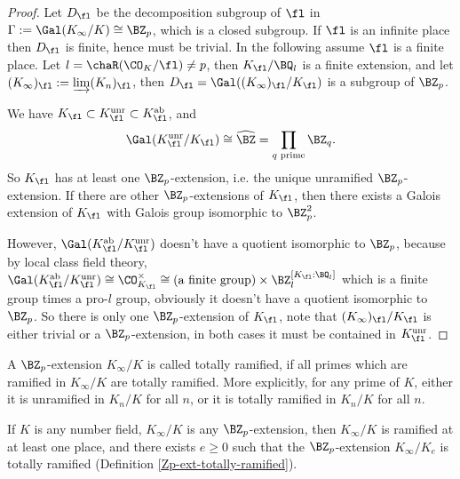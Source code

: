 \begin{proof}
Let $D_\fl$ be the decomposition subgroup of $\fl$ in $\Gamma:=\Gal(K_\infty/K)\cong\BZ_p$,
which is a closed subgroup.
If $\fl$ is an infinite place then $D_\fl$ is finite, hence must be trivial.
In the following assume $\fl$ is a finite place.
Let $l=\chaR(\CO_K/\fl)\neq p$, then $K_\fl/\BQ_l$ is a finite extension,
and let $(K_\infty)_\fl:=\varinjlim(K_n)_\fl$, then
$D_\fl=\Gal((K_\infty)_\fl/K_\fl)$ is a subgroup of $\BZ_p$.

We have $K_\fl\subset K_\fl^{\mathrm{unr}}\subset K_\fl^{\mathrm{ab}}$,
and
$$
\Gal(K_\fl^{\mathrm{unr}}/K_\fl)\cong\widehat\BZ
=\prod_{q\text{ prime}}\BZ_q.
$$
So $K_\fl$ has at least one $\BZ_p$-extension, i.e. the unique unramified
$\BZ_p$-extension. If there are other $\BZ_p$-extensions of $K_\fl$,
then there exists a Galois extension of $K_\fl$ with Galois group
isomorphic to $\BZ_p^2$.

However, $\Gal(K_\fl^{\mathrm{ab}}/K_\fl^{\mathrm{unr}})$
doesn't have a quotient isomorphic to $\BZ_p$, because by
local class field theory,
$\Gal(K_\fl^{\mathrm{ab}}/K_\fl^{\mathrm{unr}})\cong\CO_{K_\fl}^\times\cong
(\text{a finite group})\times\BZ_l^{[K_\fl:\BQ_l]}$ which is a finite group
times a pro-$l$ group, obviously it doesn't have a quotient isomorphic to $\BZ_p$.
So there is only one $\BZ_p$-extension of $K_\fl$,
note that $(K_\infty)_\fl/K_\fl$ is either trivial or a $\BZ_p$-extension,
in both cases it must be contained in $K_\fl^{\mathrm{unr}}$.
\end{proof}

\begin{definition}
\label{Zp-ext-totally-ramified}
A $\BZ_p$-extension $K_\infty/K$ is called totally ramified, if
all primes which are ramified in $K_\infty/K$ are totally ramified.
More explicitly, for any prime of $K$,
either it is unramified in $K_n/K$ for all $n$,
or it is totally ramified in $K_n/K$ for all $n$.
\end{definition}

\begin{lem}
\label{exists-totally-ramified}
If $K$ is any number field, $K_\infty/K$ is any $\BZ_p$-extension,
then $K_\infty/K$ is ramified at at least one place,
and there exists $e\geq 0$ such that the $\BZ_p$-extension $K_\infty/K_e$
is totally ramified (Definition \ref{Zp-ext-totally-ramified}).
\end{lem}

